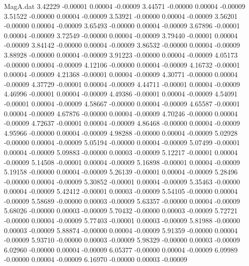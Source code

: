 \begin{filecontents}{MagA.dat}
   3.42229   -0.00001    0.00004   -0.00009
   3.44571   -0.00000    0.00004   -0.00009
   3.51522   -0.00000    0.00004   -0.00009
   3.53921   -0.00000    0.00004   -0.00009
   3.56201   -0.00000    0.00004   -0.00009
   3.65493   -0.00000    0.00004   -0.00009
   3.67896   -0.00001    0.00004   -0.00009
   3.72549   -0.00000    0.00004   -0.00009
   3.79440   -0.00001    0.00004   -0.00009
   3.84142   -0.00000    0.00004   -0.00009
   3.86532   -0.00000    0.00004   -0.00009
   3.88928   -0.00000    0.00004   -0.00009
   3.91223   -0.00000    0.00004   -0.00009
   4.05173   -0.00000    0.00004   -0.00009
   4.12106   -0.00000    0.00004   -0.00009
   4.16732   -0.00001    0.00004   -0.00009
   4.21368   -0.00001    0.00004   -0.00009
   4.30771   -0.00000    0.00004   -0.00009
   4.37729   -0.00001    0.00004   -0.00009
   4.44711   -0.00001    0.00004   -0.00009
   4.46996   -0.00001    0.00004   -0.00009
   4.49386   -0.00001    0.00004   -0.00009
   4.54091   -0.00001    0.00004   -0.00009
   4.58667   -0.00000    0.00004   -0.00009
   4.65587   -0.00001    0.00004   -0.00009
   4.67876   -0.00000    0.00004   -0.00009
   4.70246   -0.00000    0.00004   -0.00009
   4.72637   -0.00001    0.00004   -0.00009
   4.86468   -0.00000    0.00004   -0.00009
   4.95966   -0.00000    0.00004   -0.00009
   4.98288   -0.00000    0.00004   -0.00009
   5.02928   -0.00000    0.00004   -0.00009
   5.05194   -0.00000    0.00004   -0.00009
   5.07499   -0.00001    0.00004   -0.00009
   5.09883   -0.00000    0.00003   -0.00009
   5.12217   -0.00001    0.00004   -0.00009
   5.14508   -0.00001    0.00004   -0.00009
   5.16898   -0.00001    0.00004   -0.00009
   5.19158   -0.00000    0.00004   -0.00009
   5.26139   -0.00001    0.00004   -0.00009
   5.28496   -0.00000    0.00004   -0.00009
   5.30852   -0.00001    0.00004   -0.00009
   5.35463   -0.00000    0.00004   -0.00009
   5.42412   -0.00001    0.00003   -0.00009
   5.54105   -0.00000    0.00004   -0.00009
   5.58689   -0.00000    0.00003   -0.00009
   5.63357   -0.00000    0.00004   -0.00009
   5.68026   -0.00000    0.00003   -0.00009
   5.70432   -0.00000    0.00003   -0.00009
   5.72721   -0.00000    0.00004   -0.00009
   5.77403   -0.00001    0.00003   -0.00009
   5.81988   -0.00000    0.00003   -0.00009
   5.88874   -0.00000    0.00004   -0.00009
   5.91359   -0.00000    0.00004   -0.00009
   5.93710   -0.00000    0.00003   -0.00009
   5.98329   -0.00000    0.00003   -0.00009
   6.02960   -0.00000    0.00004   -0.00009
   6.05377   -0.00000    0.00004   -0.00009
   6.09989   -0.00000    0.00004   -0.00009
   6.16970   -0.00000    0.00003   -0.00009

\end{filecontents}
